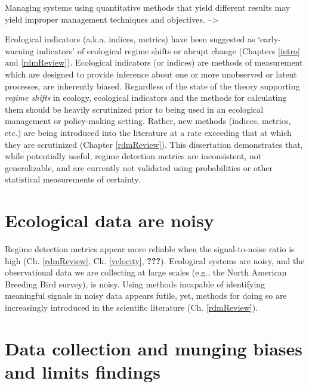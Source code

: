 \documentclass[12pt,twoside,openany]{reedthesis}
\begin{document}
Managing systems using quantitative methods that yield different results may yield improper management techniques and objectives. --\textgreater{}

Ecological indicators (a.k.a. indices, metrics) have been suggested as `early-warning indicators' of ecological regime shifts or abrupt change (Chapters \ref{intro} and \ref{rdmReview}). Ecological indicators (or indices) are methods of measurement which are designed to provide inference about one or more unobserved or latent processes, are inherently biased. Regardless of the state of the theory supporting \emph{regime shifts} in ecology, ecological indicators and the methods for calculating them should be heavily scrutinized prior to being used in an ecological management or policy-making setting. Rather, new methods (indices, metrics, etc.) are being introduced into the literature at a rate exceeding that at which they are scrutinized (Chapter \ref{rdmReview}). This dissertation demonstrates that, while potentially useful, regime detection metrics are inconsistent, not generalizable, and are currently not validated using probabilities or other statistical measurements of certainty.

\hypertarget{ecological-data-are-noisy}{%
\section{Ecological data are noisy}\label{ecological-data-are-noisy}}

Regime detection metrics appear more reliable when the signal-to-noise ratio is high (Ch. \ref{rdmReview}, Ch. \ref{velocity}, {\textbf{???}}). Ecological systems are noisy, and the observational data we are collecting at large scales (e.g., the North American Breeding Bird survey), is noisy. Using methods incapable of identifying meaningful signals in noisy data appears futile, yet, methods for doing so are increasingly introduced in the scientific literature (Ch. \ref{rdmReview}).

\hypertarget{data-collection-and-munging-biases-and-limits-findings}{%
\section{Data collection and munging biases and limits findings}\label{data-collection-and-munging-biases-and-limits-findings}}
\end{document}
